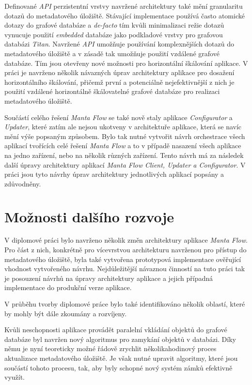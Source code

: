 Definované \textit{API} perzistentní vrstvy navržené architektury také mění granularitu dotazů do metadatového úložiště. Stávající implementace používá často atomické dotazy do grafové databáze a \textit{de-facto} tím kvůli minimalizaci režie dotazů vynucuje použití \textit{embedded} databáze jako podkladové vrstvy pro grafovou databázi \textit{Titan}. Navržené \textit{API} umožňuje používání komplexnějších dotazů do metadatového úložiště a v zásadě tak umožňuje použití vzdálené grafové databáze. Tím jsou otevřeny nové možnosti pro horizontální škálování aplikace. V práci je navrženo několik návazných úprav architektury aplikace pro dosažení horizontálního škálování, přičemž první a potenciálně nejefektivnější z nich je použití vzdálené horizontálně škálovatelné grafové databáze pro realizaci metadatového úložiště.

Součástí celého řešení \textit{Manta Flow} se také nově staly aplikace \textit{Configurator} a \textit{Updater}, které zatím ale nejsou ukotveny v architektuře aplikace, která se navíc mění výše popsaným způsobem. Bylo tak nutné vytvořit návrh orchestrace všech aplikací tvořících celé řešení \textit{Manta Flow} a to v případě nasazení všech aplikace na jedno zařízení, nebo na několik různých zařízení. Tento návrh má za následek další úpravy architektury aplikací \textit{Manta Flow Client, Updater a Configurator}. V práci jsou tyto návrhy úprav architektury jednotlivých aplikací popsány a zdůvodněny.

\section{Možnosti dalšího rozvoje}

V diplomové práci bylo navrženo několik změn architektury aplikace \textit{Manta Flow}. Pro část z nich, konkrétně pro vícevrstvou architekturu navrženou pro přístup do metadatového úložiště, byla také vytvořena prototypová implementace ověřující vhodnost vytvořeného návrhu. Nejdůležitější návaznou činností na tuto práci tak je posouzení návrhů na úpravy architektury aplikace a jejich případná implementace do produkční verze aplikace.

V průběhu tvorby diplomové práce bylo také identifikováno několik oblastí, které by mohly být dále zkoumány a rozvíjeny.

Kvůli neschopnosti aplikace provádět paralelní vkládání objektů do grafové databáze byl navržen nový algoritmus pro zamykání objektů v databázi. Díky němu je nyní teoreticky možné řádově zrychlit několikahodinový proces aktualizace metadatového úložiště. Je však nutné upravit algoritmy, které jsou součástí tohoto procesu, tak, aby byly schopné nový systém zámků efektivně využít.

